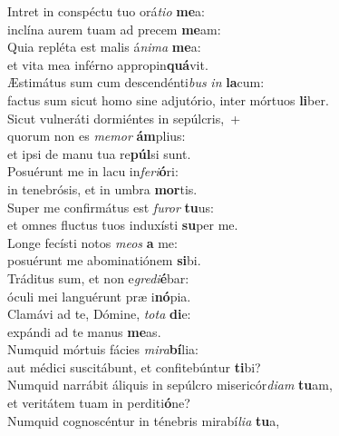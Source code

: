 \evenverse Intret in conspéctu tuo orá\textit{ti}\textit{o} \textbf{me}a:~\*\\
\evenverse inclína aurem tuam ad precem \textbf{me}am:\\
\oddverse Quia repléta est malis á\textit{ni}\textit{ma} \textbf{me}a:~\*\\
\oddverse et vita mea inférno appropin\textbf{quá}vit.\\
\evenverse Æstimátus sum cum descendénti\textit{bus} \textit{in} \textbf{la}cum:~\*\\
\evenverse factus sum sicut homo sine adjutório, inter mórtuos \textbf{li}ber.\\
\oddverse Sicut vulneráti dormiéntes in sepúlcris,~+\\
\oddverse  quorum non es \textit{me}\textit{mor} \textbf{ám}plius:~\*\\
\oddverse et ipsi de manu tua re\textbf{púl}si sunt.\\
\evenverse Posuérunt me in lacu in\textit{fe}\textit{ri}\textbf{ó}ri:~\*\\
\evenverse in tenebrósis, et in umbra \textbf{mor}tis.\\
\oddverse Super me confirmátus est \textit{fu}\textit{ror} \textbf{tu}us:~\*\\
\oddverse et omnes fluctus tuos induxísti \textbf{su}per me.\\
\evenverse Longe fecísti notos \textit{me}\textit{os} \textbf{a} me:~\*\\
\evenverse posuérunt me abominatiónem \textbf{si}bi.\\
\oddverse Tráditus sum, et non e\textit{gre}\textit{di}\textbf{é}bar:~\*\\
\oddverse óculi mei languérunt præ i\textbf{nó}pia.\\
\evenverse Clamávi ad te, Dómine, \textit{to}\textit{ta} \textbf{di}e:~\*\\
\evenverse expándi ad te manus \textbf{me}as.\\
\oddverse Numquid mórtuis fácies \textit{mi}\textit{ra}\textbf{bí}lia:~\*\\
\oddverse aut médici suscitábunt, et confitebúntur \textbf{ti}bi?\\
\evenverse Numquid narrábit áliquis in sepúlcro misericór\textit{di}\textit{am} \textbf{tu}am,~\*\\
\evenverse et veritátem tuam in perditi\textbf{ó}ne?\\
\oddverse Numquid cognoscéntur in ténebris mirabí\textit{li}\textit{a} \textbf{tu}a,~\*\\
